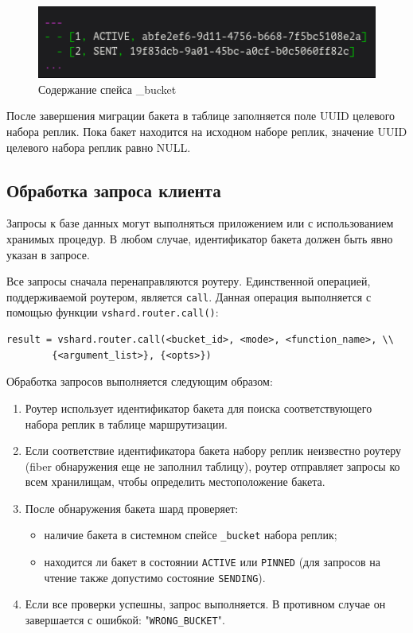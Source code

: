 \begin{figure}
  \centering
  \includegraphics[scale=0.5]{inc/bucket-space.png}
  \caption{Содержание спейса \_bucket}
  \label{fig:fig06}
\end{figure}

После завершения миграции бакета в таблице заполняется поле UUID целевого
набора реплик. Пока бакет находится на исходном наборе реплик, значение UUID
целевого набора реплик равно NULL.

\subsection{Обработка запроса клиента}

Запросы к базе данных могут выполняться приложением или с использованием
хранимых процедур. В любом случае, идентификатор бакета должен быть явно указан
в запросе.

Все запросы сначала перенаправляются роутеру. Единственной операцией,
поддерживаемой роутером, является \texttt{call}. Данная операция выполняется с
помощью функции \texttt{vshard.router.call()}:

\begin{verbatim}
result = vshard.router.call(<bucket_id>, <mode>, <function_name>, \\
        {<argument_list>}, {<opts>})
\end{verbatim}

Обработка запросов выполняется следующим образом:

\begin{enumerate}
\item Роутер использует идентификатор бакета для поиска соответствующего набора
    реплик в таблице маршрутизации.
\item Если соответствие идентификатора бакета набору реплик неизвестно роутеру
    (fiber обнаружения еще не заполнил таблицу), роутер отправляет запросы ко
    всем хранилищам, чтобы определить местоположение бакета.
\item После обнаружения бакета шард проверяет:
\begin{itemize}
    \item наличие бакета в системном спейсе \texttt{\_bucket} набора реплик;
    \item находится ли бакет в состоянии \texttt{ACTIVE} или \texttt{PINNED}
        (для запросов на чтение также допустимо состояние \texttt{SENDING}).
\end{itemize}
\item Если все проверки успешны, запрос выполняется. В противном случае он
    завершается с ошибкой: "\texttt{WRONG\_BUCKET}".
\end{enumerate}
